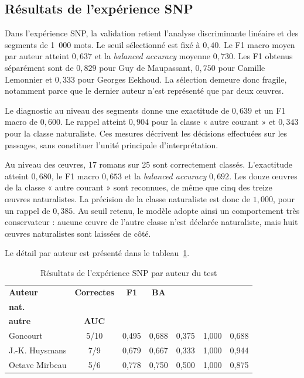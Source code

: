\subsection{Résultats de l'expérience SNP}

Dans l'expérience SNP, la validation retient l'analyse discriminante linéaire et des segments de 1~000 mots. Le seuil sélectionné est fixé à $0{,}40$. Le F1 macro moyen par auteur atteint $0{,}637$ et la \textit{balanced accuracy} moyenne $0{,}730$. Les F1 obtenus séparément sont de $0{,}829$ pour Guy de Maupassant, $0{,}750$ pour Camille Lemonnier et $0{,}333$ pour Georges Eekhoud. La sélection demeure donc fragile, notamment parce que le dernier auteur n'est représenté que par deux œuvres.

Le diagnostic au niveau des segments donne une exactitude de $0{,}639$ et un F1 macro de $0{,}600$. Le rappel atteint $0{,}904$ pour la classe « autre courant » et $0{,}343$ pour la classe naturaliste. Ces mesures décrivent les décisions effectuées sur les passages, sans constituer l'unité principale d'interprétation.

Au niveau des œuvres, 17 romans sur 25 sont correctement classés. L'exactitude atteint $0{,}680$, le F1 macro $0{,}653$ et la \textit{balanced accuracy} $0{,}692$. Les douze œuvres de la classe « autre courant » sont reconnues, de même que cinq des treize œuvres naturalistes. La précision de la classe naturaliste est donc de $1{,}000$, pour un rappel de $0{,}385$. Au seuil retenu, le modèle adopte ainsi un comportement très conservateur : aucune œuvre de l'autre classe n'est déclarée naturaliste, mais huit œuvres naturalistes sont laissées de côté.

Le détail par auteur est présenté dans le tableau~\ref{tab:resultats_snp_auteurs}.

\begin{table}[H]
    \centering
    \caption{Résultats de l'expérience SNP par auteur du test}
    \label{tab:resultats_snp_auteurs}
    \small
    \setlength{\tabcolsep}{4pt}
    \begin{tabularx}{\textwidth}{>{\raggedright\arraybackslash}X c c c c c c}
        \toprule
        \textbf{Auteur} & \textbf{Correctes} & \textbf{F1} & \textbf{BA}
        & \shortstack{\textbf{Rappel}\\\textbf{nat.}}
        & \shortstack{\textbf{Rappel}\\\textbf{autre}}
        & \textbf{AUC} \\
        \midrule
        Goncourt & 5/10 & 0,495 & 0,688 & 0,375 & 1,000 & 0,688 \\
        J.-K. Huysmans & 7/9 & 0,679 & 0,667 & 0,333 & 1,000 & 0,944 \\
        Octave Mirbeau & 5/6 & 0,778 & 0,750 & 0,500 & 1,000 & 0,875 \\
        \bottomrule
    \end{tabularx}
\end{table}

